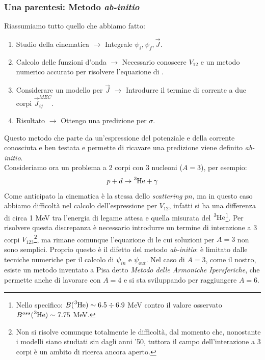 \subsubsection{Una parentesi: Metodo \textit{ab-initio}}\label{0318-sec-abinitio} Riassumiamo tutto quello che abbiamo fatto:
\begin{enumerate}[1]
    \item Studio della cinematica $\to$ Integrale $\psi_i,\psi_f,\vec{J}$.
    \item Calcolo delle funzioni d'onda $\to$ Necessario conoscere $V_{12}$ e un metodo numerico accurato per risolvere l'equazione di \Sch.
    \item Considerare un modello  per $\vec{J}$ $\to$ Introdurre il termine di corrente a due corpi $\vec{J}^{MEC}_{ij}$.
    \item Risultato $\to$ Ottengo una predizione per $\sigma$.
\end{enumerate}
Questo metodo che parte da un'espressione del potenziale e della corrente conosciuta e ben testata e permette di ricavare una predizione viene definito \textit{ab-initio}.\\
Consideriamo ora un problema a 2 corpi con 3 nucleoni ($A=3$), per esempio:
$$p+d\to \ce{^3He}+\gamma$$
Come anticipato la cinematica è la stessa dello \textit{scattering} $pn$, ma in questo caso abbiamo difficoltà nel calcolo dell'espressione per $V_{12}$, infatti si ha una differenza di circa 1 MeV tra l'energia di legame attesa e quella misurata del $\ce{^3He}$\footnote{Nello specifico: $B(\ce{^3He})\sim6.5\div 6.9$ MeV contro il valore osservato $B^{oss}(\ce{^3He})\sim7.75$ MeV.%
}. Per risolvere questa discrepanza è necessario introdurre un termine di interazione a 3 corpi $V_{123}$\footnote{Non si risolve comunque totalmente le difficoltà, dal momento che, nonostante i modelli siano studiati sin dagli anni '50, tuttora il campo dell'interazione a 3 corpi è un ambito di ricerca ancora aperto.}, ma rimane comunque l'equazione di \Sch{} le cui soluzioni per $A=3$ non sono semplici. Proprio questo è il difetto del metodo \textit{ab-initio}: è limitato dalle tecniche numeriche per il calcolo di $\psi_{in}$ e $\psi_{out}$. Nel caso di $A=3$, come il nostro, esiste un metodo inventato a Pisa detto \textit{Metodo delle Armoniche Ipersferiche}, che permette anche di lavorare con $A=4$ e si sta sviluppando per raggiungere $A=6$.\\
